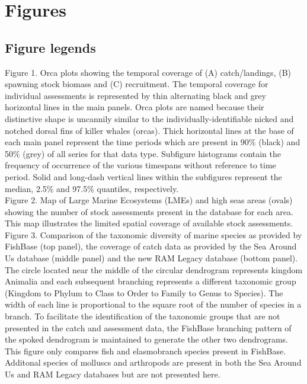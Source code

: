 \section*{Figures}
\subsection*{Figure legends}

\noindent Figure 1. Orca plots showing the temporal coverage of (A)
catch/landings, (B) spawning stock biomass and (C) recruitment. The
temporal coverage for individual assessments is represented by thin
alternating black and grey horizontal lines in the main panels. Orca
plots are named because their distinctive shape is uncannily similar
to the individually-identifiable nicked and notched dorsal fins of
killer whales (orcas). Thick horizontal lines at the base of each main
panel represent the time periods which are present in 90\% (black) and
50\% (grey) of all series for that data type.  Subfigure histograms
contain the frequency of occurrence of the various timespans without
reference to time period. Solid and long-dash vertical lines within
the subfigures represent the median,
2.5\% and 97.5\% quantiles, respectively.\\

\noindent Figure 2. Map of Large Marine Ecosystems (LMEs) and
high seas areas (ovals) showing the number of stock assessments
present in the database for each area. This map illustrates the limited
spatial coverage of available stock assessments.\\

\noindent Figure 3. Comparison of the taxonomic diversity of marine
species as provided by FishBase (top panel), the coverage of catch
data as provided by the Sea Around Us database (middle panel) and the
new RAM Legacy database (bottom panel). The circle located near the
middle of the circular dendrogram represents kingdom Animalia and each
subsequent branching represents a different taxonomic group (Kingdom
to Phylum to Class to Order to Family to Genus to Species). The width
of each line is proportional to the square root of the number of
species in a branch. To facilitate the identification of the taxonomic
groups that are not presented in the catch and assessment data, the
FishBase branching pattern of the spoked dendrogram is maintained to
generate the other two dendrograms.  This figure only compares fish
and elasmobranch species present in FishBase. Additonal species of
molluscs and arthropods are present in both the Sea Around Us and RAM
Legacy databases but are not presented here.
\\


